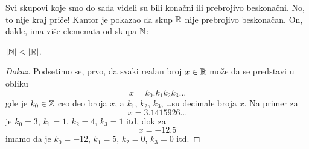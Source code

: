 Svi skupovi koje smo do sada videli su bili kona\v cni ili prebrojivo beskona\v cni. No, to nije kraj pri\v ce!
Kantor je pokazao da skup $\mathbb{R}$ nije prebrojivo beskona\v can. On, dakle, ima vi\v se elemenata od skupa $\mathbb{N}$:

\begin{THM}[Kantor]
  $|\mathbb{N}| < |\mathbb{R}|$.
\end{THM}
\begin{proof}[Dokaz]
  Podsetimo se, prvo, da svaki realan broj $x \in \mathbb{R}$ mo\v ze da se predstavi u obliku
  $$
    x = k_0.k_1 k_2 k_3 \ldots
  $$
  gde je $k_0 \in \mathbb{Z}$ ceo deo broja $x$, a $k_1$, $k_2$, $k_3$, \ldots su decimale broja $x$. Na primer za
  $$
    x = 3.1415926\ldots
  $$
  je $k_0 = 3$, $k_1 = 1$, $k_2 = 4$, $k_3 = 1$ itd, dok za
  $$
    x = -12.5
  $$
  imamo da je $k_0 = -12$, $k_1 = 5$, $k_2 = 0$, $k_3 = 0$ itd.


\end{proof}
